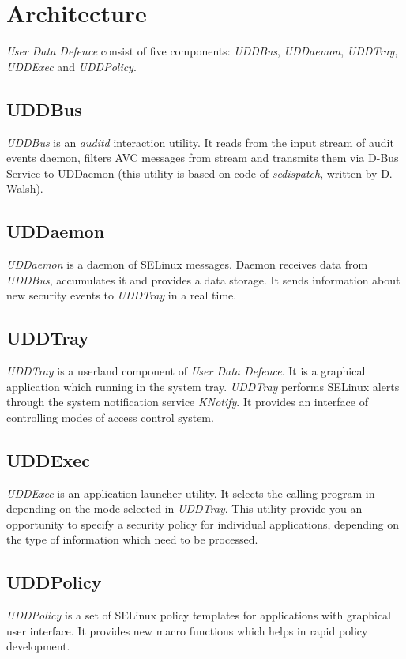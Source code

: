 \chapter{Architecture}

\emph{User Data Defence} consist of five components: \emph{UDDBus},
\emph{UDDaemon}, \emph{UDDTray}, \emph{UDDExec} and \emph{UDDPolicy}.

\section{UDDBus}

\emph{UDDBus} is an \emph{auditd} interaction utility. It reads from the
input stream of audit events daemon, filters AVC messages from stream
and transmits them via D-Bus Service to UDDaemon (this utility is based
on code of \emph{sedispatch}, written by D. Walsh).

\section{UDDaemon}

\emph{UDDaemon} is a daemon of SELinux messages. Daemon receives data
from \emph{UDDBus}, accumulates it and provides a data storage. It sends
information about new security events to \emph{UDDTray} in a real time.

\section{UDDTray}

\emph{UDDTray} is a userland component of \emph{User Data Defence}. It
is a graphical application which running in the system tray.
\emph{UDDTray} performs SELinux alerts through the system notification
service \emph{KNotify}. It provides an interface of controlling modes of
access control system.

\section{UDDExec}

\emph{UDDExec} is an application launcher utility. It selects the
calling program in depending on the mode selected in \emph{UDDTray}.
This utility provide you an opportunity to specify a security policy for
individual applications, depending on the type of information which need
to be processed.

\section{UDDPolicy}

\emph{UDDPolicy} is a set of SELinux policy templates for applications
with graphical user interface. It provides new macro functions which
helps in rapid policy development.
